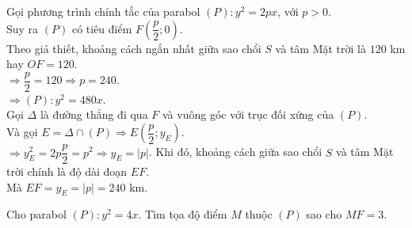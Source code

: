 \begin{bt}
{\begin{center}
\begin{tikzpicture}[scale=1, font=\footnotesize, line join=round, line cap=round, >=stealth]
			\end{tikzpicture}
		\end{center}
		Gọi phương trình chính  tắc của parabol $(P) \colon y^2 = 2px$, với $p>0$.\\
		Suy ra $(P)$ có tiêu điểm $F\left(\dfrac{p}{2};0\right)$.\\
		Theo giả thiết, khoảng cách ngắn nhất giữa sao chổi $S$ và tâm Mặt trời là $120$ km hay $OF = 120$.\\
		$\Rightarrow \dfrac{p}{2} = 120 \Rightarrow p = 240$.\\
		$\Rightarrow (P) \colon y^2 = 480x$.\\
		Gọi  $\Delta$ là đường thẳng đi qua $F$ và vuông góc với trục đối xứng của $(P)$.\\
		Và gọi $E=\Delta \cap (P) \Rightarrow E\left(\dfrac{p}{2}; y_E\right)$.\\
		$\Rightarrow y^2_E = 2p\dfrac{p}{2} = p^2 \Rightarrow y_E = |p|$.
		Khi đó, khoảng cách giữa sao chổi $S$ và tâm Mặt trời chính là độ dài đoạn $EF$.\\
		Mà $EF = y_E = |p| = 240$ km.
	}
\end{bt}

\begin{bt}%
	Cho parabol $ (P):y^2=4x $. Tìm tọa độ điểm $ M $ thuộc $ (P) $ sao cho $ MF=3 $.
\end{bt}

